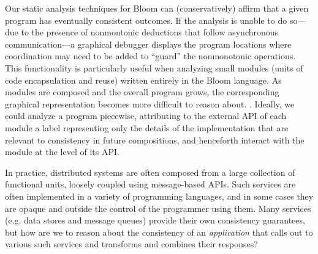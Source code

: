 
Our static analysis techniques for Bloom can
(conservatively) affirm that a given program has eventually consistent outcomes.
If the analysis is unable to do so---due to the presence of nonmontonic deductions
that follow asynchronous communication---a graphical debugger displays the
program locations where coordination may need to be added to ``guard'' the
nonmonotonic operations.    This functionality is particularly useful when
analyzing small modules (units of code encapsulation and reuse) written 
entirely in the Bloom language.
As modules are composed and the overall program grows, the corresponding graphical representation becomes more difficult to reason about.  .  Ideally,
we could analyze a program piecewise, attributing to the external API of each module a
label representing only the details of the implementation that are relevant to
consistency in future compositions, and henceforth interact with the module at
the level of its API.  


In practice, distributed systems are often composed from a large 
collection of functional units, loosely coupled using message-based APIs.
Such services are often implemented in a variety of programming 
languages, and in some cases they are opaque and outside the control of
the programmer using them.  
Many services (e.g. data stores and message queues) provide their own 
consistency guarantees, but how are we to reason about the consistency of an
\emph{application} that calls out to various such services and transforms
and combines their responses?  

